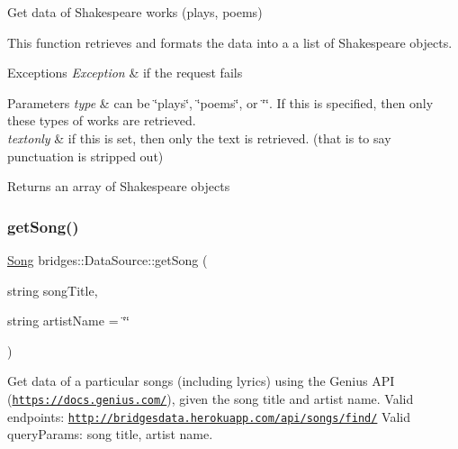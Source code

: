 Get data of Shakespeare works (plays, poems) 

This function retrieves and formats the data into a a list of Shakespeare objects.


\begin{DoxyExceptions}{Exceptions}
{\em Exception} & if the request fails\\
\hline
\end{DoxyExceptions}

\begin{DoxyParams}{Parameters}
{\em type} & can be \char`\"{}plays\char`\"{}, \char`\"{}poems\char`\"{}, or \char`\"{}\char`\"{}. If this is specified, then only these types of works are retrieved. \\
\hline
{\em textonly} & if this is set, then only the text is retrieved. (that is to say punctuation is stripped out)\\
\hline
\end{DoxyParams}
\begin{DoxyReturn}{Returns}
an array of Shakespeare objects 
\end{DoxyReturn}
\mbox{\label{classbridges_1_1_data_source_a7797e423d77ad467f9d98ebf78488c04}} 
\subsubsection{\texorpdfstring{get\+Song()}{getSong()}}
{\footnotesize\ttfamily \hyperlink{classbridges_1_1dataset_1_1_song}{Song} bridges\+::\+Data\+Source\+::get\+Song (\begin{DoxyParamCaption}\item[{string}]{song\+Title,  }\item[{string}]{artist\+Name = {\ttfamily \char`\"{}\char`\"{}} }\end{DoxyParamCaption})\hspace{0.3cm}{\ttfamily [inline]}}



Get data of a particular songs (including lyrics) using the Genius A\+PI (\href{https://docs.genius.com/}{\tt https\+://docs.\+genius.\+com/}), given the song title and artist name. Valid endpoints\+: \href{http://bridgesdata.herokuapp.com/api/songs/find/}{\tt http\+://bridgesdata.\+herokuapp.\+com/api/songs/find/} Valid query\+Params\+: song title, artist name. 

